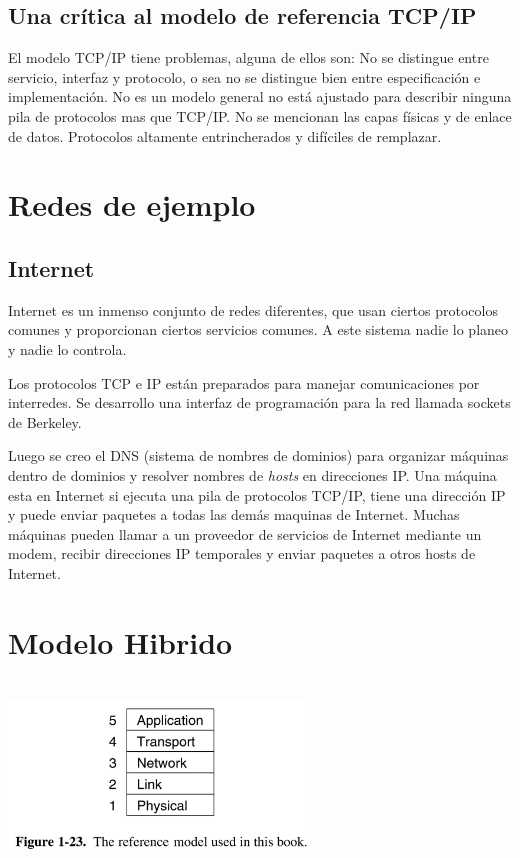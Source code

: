 \documentclass[10pt,a4paper]{report}
\begin{document}
\subsection{Una crítica al modelo de referencia TCP/IP}

	\par El modelo TCP/IP tiene problemas, alguna de ellos son: No se distingue entre servicio, interfaz y protocolo, o sea no se distingue bien entre especificación e implementación. No es un modelo general no está ajustado para describir ninguna pila de protocolos mas que TCP/IP. No se mencionan las capas físicas y de enlace de datos. Protocolos altamente entrincherados y difíciles de remplazar.

\section{Redes de ejemplo}

\subsection{Internet}
\par Internet es un inmenso conjunto de redes diferentes, que usan ciertos protocolos comunes y proporcionan ciertos servicios comunes. A este sistema nadie lo planeo y nadie lo controla. 

\par Los protocolos TCP e IP están preparados para manejar comunicaciones por 
interredes. Se desarrollo una interfaz de programación para la red llamada sockets 
de Berkeley.

	\par Luego se creo el DNS (sistema de nombres de dominios) para organizar máquinas 
dentro de dominios y resolver nombres de \textit{hosts} en direcciones IP. Una máquina esta en Internet si ejecuta una pila de protocolos TCP/IP, tiene una dirección IP y puede enviar paquetes a todas las demás maquinas de Internet. Muchas máquinas pueden llamar a un proveedor de servicios de Internet mediante un modem, recibir direcciones IP temporales y enviar paquetes a otros hosts de Internet.

\section{Modelo Hibrido}

	\begin{center}
		\includegraphics[width=8cm, height=5cm]{./imagenes/modelo.png} 
	\end{center}
\end{document}
